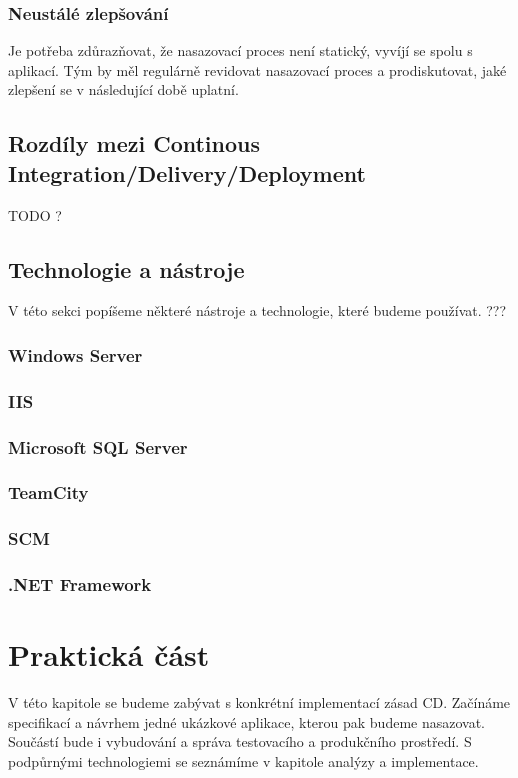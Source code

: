 \subsection{Neustálé zlepšování}
Je potřeba zdůrazňovat, že nasazovací proces není statický, vyvíjí se spolu s aplikací. Tým by měl regulárně revidovat nasazovací proces a prodiskutovat, jaké zlepšení se v následující době uplatní.

\section{Rozdíly mezi Continous Integration/Delivery/Deployment}
TODO ?

\section{Technologie a nástroje}
V této sekci popíšeme některé nástroje a technologie, které budeme používat. ???

\subsection{Windows Server}

\subsection{IIS}

\subsection{Microsoft SQL Server}

\subsection{TeamCity}

\subsection{SCM}

\subsection{.NET Framework}


\chapter{Praktická část}
\label{ch:impl}
V této kapitole se budeme zabývat s konkrétní implementací zásad CD. Začínáme specifikací a návrhem jedné ukázkové aplikace, kterou pak budeme nasazovat. Součástí bude i vybudování a správa testovacího a produkčního prostředí. S podpůrnými technologiemi se seznámíme v kapitole analýzy a implementace.

